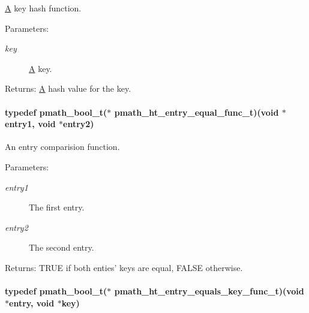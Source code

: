\hyperlink{class_a}{A} key hash function. 

\begin{Desc}
\item[Parameters:]
\begin{description}
\item[{\em key}]\hyperlink{class_a}{A} key. \end{description}
\end{Desc}
\begin{Desc}
\item[Returns:]\hyperlink{class_a}{A} hash value for the key. \end{Desc}
\hypertarget{group__hashtables_g9eeec544dd1335e2b50bf9fedb5e154b}{
\paragraph[{pmath\_\-ht\_\-entry\_\-equal\_\-func\_\-t}]{\setlength{\rightskip}{0pt plus 5cm}typedef {\bf pmath\_\-bool\_\-t}($\ast$ {\bf pmath\_\-ht\_\-entry\_\-equal\_\-func\_\-t})(void $\ast$entry1, void $\ast$entry2)}\hfill}
\label{group__hashtables_g9eeec544dd1335e2b50bf9fedb5e154b}


An entry comparision function. 

\begin{Desc}
\item[Parameters:]
\begin{description}
\item[{\em entry1}]The first entry. \item[{\em entry2}]The second entry. \end{description}
\end{Desc}
\begin{Desc}
\item[Returns:]TRUE if both enties' keys are equal, FALSE otherwise. \end{Desc}
\hypertarget{group__hashtables_gb4bf3ce0ea6f0d5b646cd6bc839bed4f}{
\paragraph[{pmath\_\-ht\_\-entry\_\-equals\_\-key\_\-func\_\-t}]{\setlength{\rightskip}{0pt plus 5cm}typedef {\bf pmath\_\-bool\_\-t}($\ast$ {\bf pmath\_\-ht\_\-entry\_\-equals\_\-key\_\-func\_\-t})(void $\ast$entry, void $\ast$key)}\hfill}
\label{group__hashtables_gb4bf3ce0ea6f0d5b646cd6bc839bed4f}



